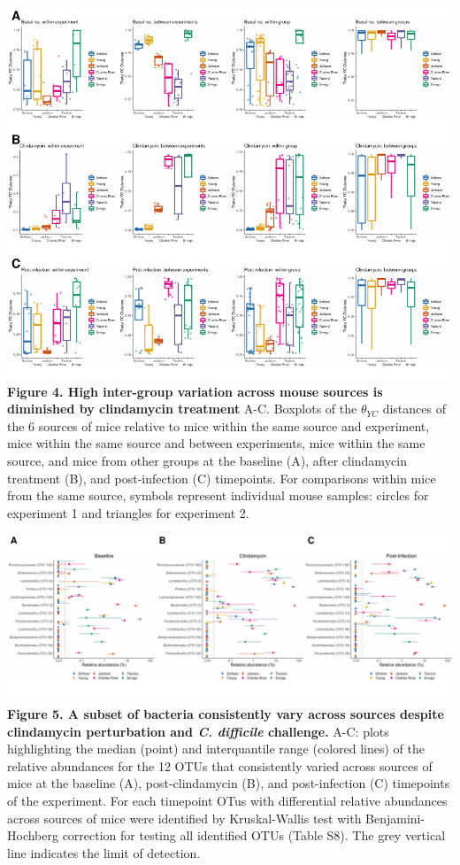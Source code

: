 \documentclass[11pt,]{article}
\begin{document}
\includegraphics{figure_4.pdf} \textbf{Figure 4. High inter-group
variation across mouse sources is diminished by clindamycin treatment}
A-C. Boxplots of the \(\theta_{YC}\) distances of the 6 sources of mice
relative to mice within the same source and experiment, mice within the
same source and between experiments, mice within the same source, and
mice from other groups at the baseline (A), after clindamycin treatment
(B), and post-infection (C) timepoints. For comparisons within mice from
the same source, symbols represent individual mouse samples: circles for
experiment 1 and triangles for experiment 2.

\newpage

\includegraphics{figure_5.pdf} \textbf{Figure 5. A subset of bacteria
consistently vary across sources despite clindamycin perturbation and
\emph{C. difficile} challenge.} A-C: plots highlighting the median
(point) and interquantile range (colored lines) of the relative
abundances for the 12 OTUs that consistently varied across sources of
mice at the baseline (A), post-clindamycin (B), and post-infection (C)
timepoints of the experiment. For each timepoint OTus with differential
relative abundances across sources of mice were identified by
Kruskal-Wallis test with Benjamini-Hochberg correction for testing all
identified OTUs (Table S8). The grey vertical line indicates the limit
of detection.
\end{document}

